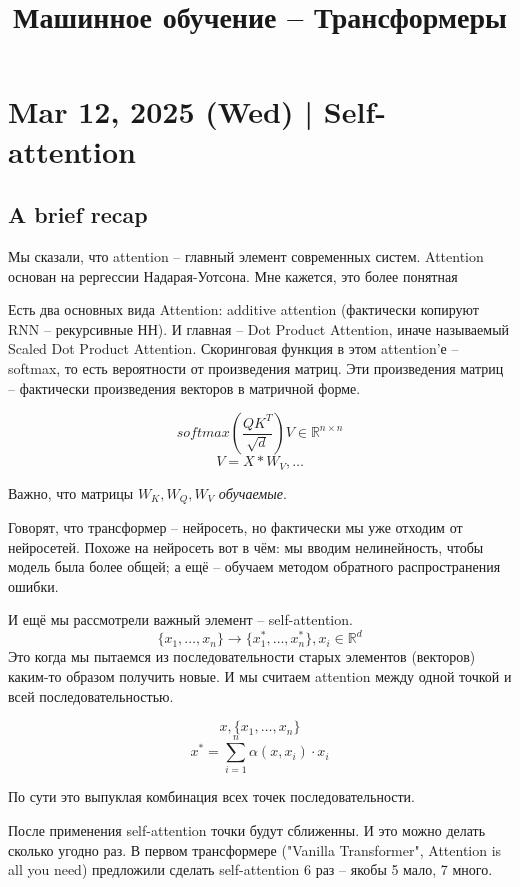\documentclass[a4paper,12pt]{article}
\begin{document}
\title{Машинное обучение -- Трансформеры}
\maketitle
\tableofcontents
	
\section{Mar 12, 2025 (Wed) | Self-attention }

\subsection{A brief recap}

Мы сказали, что attention -- главный элемент современных систем.
Attention основан на рергессии Надарая-Уотсона.
Мне кажется, это более понятная

Есть два основных вида Attention: additive attention (фактически копируют RNN -- рекурсивные НН).
И главная -- Dot Product Attention, иначе называемый Scaled Dot Product Attention.
Скоринговая функция в этом attention'е -- softmax, то есть вероятности от произведения матриц.
Эти произведения матриц -- фактически произведения векторов в матричной форме.

\[ softmax \left( \frac{QK^T}{\sqrt d} \right) V \in \mathds R ^{n \times n}  \]
\[ V = X * W_V, \dots \]

Важно, что матрицы $ W_K, W_Q, W_V $ \emph{обучаемые}.

Говорят, что трансформер -- нейросеть, но фактически мы уже отходим от нейросетей.
Похоже на нейросеть вот в чём: мы вводим нелинейность, чтобы модель была более общей; а ещё -- обучаем методом обратного распространения ошибки.

И ещё мы рассмотрели важный элемент -- self-attention.
\[ \{ x_1, \dots, x_n \} \to \{ x_1^*, \dots, x_n^* \}, x_i \in \mathds R^d \]
Это когда мы пытаемся из последовательности старых элементов (векторов) каким-то образом получить новые.
И мы считаем attention между одной точкой и всей последовательностью.

\[ x, \{ x_1, \dots, x_n \} \]
\[ x^* = \sum_{i=1}^n \alpha (x, x_i) \cdot x_i \]

По сути это выпуклая комбинация всех точек последовательности.

После применения self-attention точки будут сближенны.
И это можно делать сколько угодно раз.
В первом трансформере ("Vanilla Transformer", Attention is all you need) предложили сделать self-attention 6 раз -- якобы 5 мало, 7 много.
\end{document}
